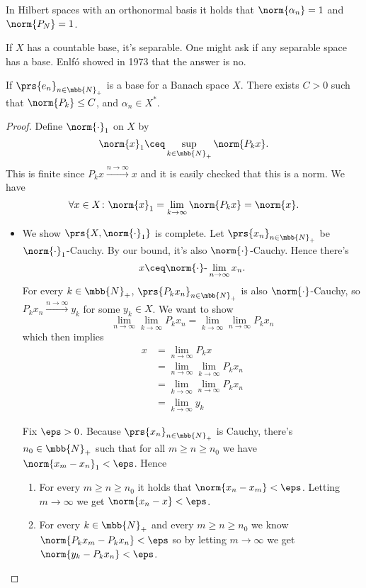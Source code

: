 \documentclass[10pt, twoside]{book}
\begin{document}
\begin{remark}
In Hilbert spaces with an orthonormal basis it holds that $\norm{\alpha_n} = 1$ and $\norm{P_N} = 1$.
\end{remark}

\begin{remark}
If $X$ has a countable base, it's separable. One might ask if any separable space has a base. Enlfó showed in 1973 that the answer is no.
\end{remark}

\begin{theorem}
If $\prs{e_n}_{n \in \mbb{N}_+}$ is a base for a Banach space $X$. There exists $C>0$ such that $\norm{P_k} \leq C$, and $\alpha_n \in X^*$.
\end{theorem}

\begin{proof}
Define $\norm{\cdot}_1$ on $X$ by
\[\norm{x}_1 \ceq \sup_{k \in \mbb{N}_+} \norm{P_k x} \text{.}\]
This is finite since $P_k x \xrightarrow{n\to\infty} x$ and it is easily checked that this is a norm.
We have
\[\forall x \in X \colon \norm{x}_1 = \lim_{k \to \infty} \norm{P_k x} = \norm{x} \text{.}\]

\begin{itemize}
\item We show $\prs{X, \norm{\cdot}_1}$ is complete. Let $\prs{x_n}_{n \in \mbb{N}_+}$ be $\norm{\cdot}_1$-Cauchy. By our bound, it's also $\norm{\cdot}$-Cauchy. Hence there's
\[x \ceq \norm{\cdot}\text{-}\lim_{n\to\infty} x_n \text{.}\]
For every $k \in \mbb{N}_+$, $\prs{P_k x_n}_{n \in \mbb{N}_+}$ is also $\norm{\cdot}$-Cauchy, so $P_k x_n \xrightarrow{n\to\infty} y_k$ for some $y_k \in X$. We want to show
\[\lim_{n\to\infty} \lim_{k\to\infty} P_k x_n
=
\lim_{k \to \infty} \lim_{n\to\infty} P_k x_n\]
which then implies
\begin{align*}
x
&=
\lim_{n\to\infty} P_k x
\\&=
\lim_{n\to\infty} \lim_{k\to\infty} P_k x_n
\\&=
\lim_{k \to \infty} \lim_{n\to\infty} P_k x_n
\\&=
\lim_{k\to\infty} y_k
\end{align*}

Fix $\eps > 0$. Because $\prs{x_n}_{n \in \mbb{N}_+}$ is Cauchy, there's $n_0 \in \mbb{N}_+$ such that for all $m \geq n \geq n_0$ we have $\norm{x_m - x_n}_1 < \eps$.
Hence
\begin{enumerate}
\item For every $m \geq n \geq n_0$ it holds that $\norm{x_n - x_m} < \eps$. Letting $m \to \infty$ we get $\norm{x_n - x} < \eps$.
\item For every $k \in \mbb{N}_+$ and every $m \geq n \geq n_0$ we know $\norm{P_k x_m - P_k x_n} < \eps$ so by letting $m \to \infty$ we get $\norm{y_k - P_k x_n} < \eps$.
\end{enumerate}


\end{itemize}
\end{proof}
\end{document}
